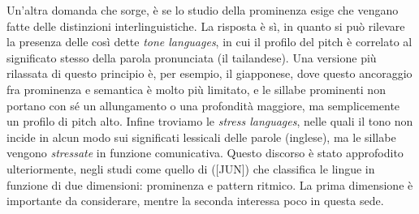 \documentclass[twoside,twocolumn,10pt]{extarticle}
\theoremstyle{definition}
\begin{document}
	Un'altra domanda che sorge, è se lo studio della prominenza esige che vengano fatte delle distinzioni interlinguistiche. La risposta è sì, in quanto si può rilevare la presenza delle così dette \textit{tone languages}, in cui il profilo del pitch è correlato al significato stesso della parola pronunciata (il tailandese). Una versione più rilassata di questo principio è, per esempio, il giapponese, dove questo ancoraggio fra prominenza e semantica è molto più limitato, e le sillabe prominenti non portano con sé un allungamento o una profondità maggiore, ma semplicemente un profilo di pitch alto. Infine troviamo le \textit{stress languages}, nelle quali il tono non incide in alcun modo sui significati lessicali delle parole (inglese), ma le sillabe vengono \textit{stressate} in funzione comunicativa. Questo discorso è stato approfodito ulteriormente, negli studi come quello di ([JUN]) che classifica le lingue in funzione di due dimensioni: prominenza e pattern ritmico. La prima dimensione è importante da considerare, mentre la seconda interessa poco in questa sede.
\end{document}
